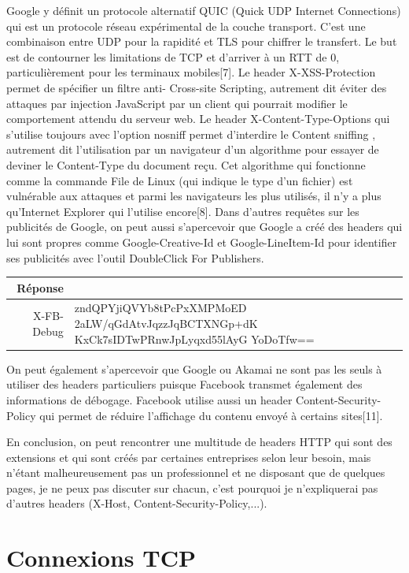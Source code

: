 \documentclass[conference]{IEEEtran}
\begin{document}
Google y définit un protocole alternatif QUIC (Quick UDP Internet Connections) qui est un protocole réseau expérimental de la couche transport. C'est une combinaison entre UDP pour la rapidité et TLS pour chiffrer le transfert. Le but est de contourner les limitations de TCP et d'arriver à un RTT de 0, particulièrement pour les terminaux mobiles[7]. Le header X-XSS-Protection permet de spécifier un filtre anti-\og{} Cross-site Scripting\fg{}, autrement dit éviter des attaques par injection JavaScript par un client qui pourrait modifier le comportement attendu du serveur web. Le header X-Content-Type-Options qui s'utilise toujours avec l'option nosniff permet d'interdire le \og{} Content sniffing \fg{}, autrement dit l'utilisation par un navigateur d'un algorithme pour essayer de deviner le Content-Type du document reçu. Cet algorithme qui fonctionne comme la commande File de Linux (qui indique le type d'un fichier) est vulnérable aux attaques et parmi les navigateurs les plus utilisés, il n'y a plus qu'Internet Explorer qui l'utilise encore[8]. Dans d'autres requêtes sur les publicités de Google, on peut aussi s'apercevoir que Google a créé des headers qui lui sont propres comme Google-Creative-Id et Google-LineItem-Id pour identifier ses publicités avec l'outil DoubleClick For Publishers.

\begin{tabular}{|r|p{5.1cm}|}
  \hline
  Réponse & \\
  \hline
  X-FB-Debug & zndQPYjiQVYb8tPcPxXMPMoED
  2aLW/qGdAtvJqzzJqBCTXNGp+dK
  KxCk7sIDTwPRnwJpLyqxd55lAyG
  YoDoTfw== \\
  \hline
\end{tabular}

On peut également s'apercevoir que Google ou Akamai ne sont pas les seuls à utiliser des headers particuliers puisque Facebook transmet également des informations de débogage. Facebook utilise aussi un header Content-Security-Policy qui permet de réduire l'affichage du contenu envoyé à certains sites[11].

En conclusion, on peut rencontrer une multitude de headers HTTP qui sont des extensions et qui sont créés par certaines entreprises selon leur besoin, mais n'étant malheureusement pas un professionnel et ne disposant que de quelques pages, je ne peux pas discuter sur chacun, c'est pourquoi je n'expliquerai pas d'autres headers (X-Host, Content-Security-Policy,...). 

\section{Connexions TCP}
\end{document}
